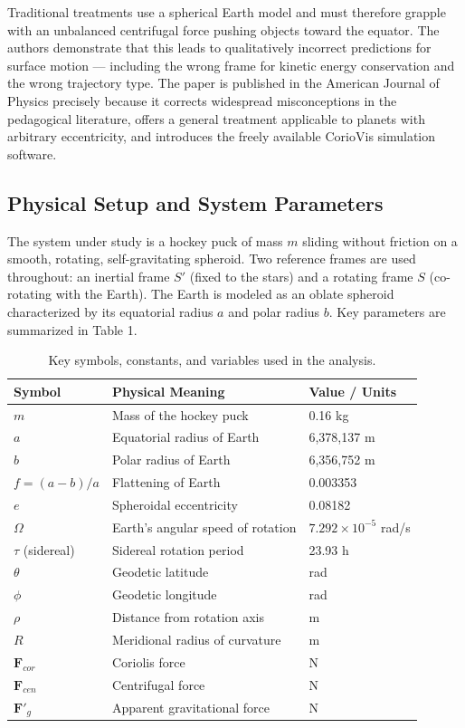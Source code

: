 \documentclass[10pt, a4paper]{article}
\begin{document}
Traditional treatments use a spherical Earth model and must therefore grapple with an unbalanced centrifugal force pushing objects toward the equator. The authors demonstrate that this leads to qualitatively incorrect predictions for surface motion — including the wrong frame for kinetic energy conservation and the wrong trajectory type. The paper is published in the American Journal of Physics precisely because it corrects widespread misconceptions in the pedagogical literature, offers a general treatment applicable to planets with arbitrary eccentricity, and introduces the freely available CorioVis simulation software.

\subsection{Physical Setup and System Parameters}
The system under study is a hockey puck of mass $m$ sliding without friction on a smooth, rotating, self-gravitating spheroid. Two reference frames are used throughout: an inertial frame $S'$ (fixed to the stars) and a rotating frame $S$ (co-rotating with the Earth). The Earth is modeled as an oblate spheroid characterized by its equatorial radius $a$ and polar radius $b$. Key parameters are summarized in Table 1.

\begin{table}[h]
\centering
\begin{tabular}{lll}
\toprule
\textbf{Symbol} & \textbf{Physical Meaning} & \textbf{Value / Units} \\
\midrule
$m$ & Mass of the hockey puck & 0.16 kg \\
$a$ & Equatorial radius of Earth & 6,378,137 m \\
$b$ & Polar radius of Earth & 6,356,752 m \\
$f = (a-b)/a$ & Flattening of Earth & 0.003353 \\
$e$ & Spheroidal eccentricity & 0.08182 \\
$\Omega$ & Earth's angular speed of rotation & $7.292 \times 10^{-5}$ rad/s \\
$\tau$ (sidereal) & Sidereal rotation period & 23.93 h \\
$\theta$ & Geodetic latitude & rad \\
$\phi$ & Geodetic longitude & rad \\
$\rho$ & Distance from rotation axis & m \\
$R$ & Meridional radius of curvature & m \\
$\mathbf{F}_{cor}$ & Coriolis force & N \\
$\mathbf{F}_{cen}$ & Centrifugal force & N \\
$\mathbf{F}'_g$ & Apparent gravitational force & N \\
\bottomrule
\end{tabular}
\caption{Key symbols, constants, and variables used in the analysis.}
\label{tab:params}
\end{table}
\end{document}
